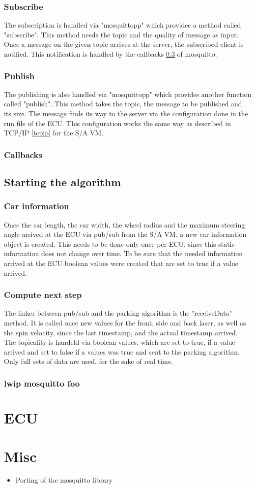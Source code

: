 \documentclass[paper=a4, fontsize=11pt]{scrreprt}
\begin{document}
  \subsection{Subscribe}
The subscription is handled via "mosquittopp" which provides a method called "subscribe". This method needs the topic and the quality of message as input. Once a message on the given topic arrives at the server, the subscribed client is notified. This notification is handled by the callbacks \ref{callbacks} of mosquitto.
  \subsection{Publish}
The publishing is also handled via "mosquittopp" which provides another function called "publish". This method takes the topic, the message to be published and its size. The message finds its way to the server via the configuration done in the run file of the ECU. This configuration works the same way as described in TCP/IP \ref{tcpip} for the S/A VM.
  \subsection{Callbacks} \label{callbacks}
  \section{Starting the algorithm}
  \subsection{Car information}
Once the car length, the car width, the wheel radius and the maximum steering angle arrived at the ECU via pub/sub from the S/A VM, a new car information object is created. This needs to be done only once per ECU, since this static information does not change over time.
To be sure that the needed information arrived at the ECU boolean values were created that are set to true if a value arrived.
  \subsection{Compute next step}
The linker between pub/sub and the parking algorithm is the "receiveData" method. It is called once new values for the front, side and back laser, as well as the spin velocity, since the last timestamp, and the actual timestamp arrived. The topicality is handeld via boolean values, which are set to true, if a value arrived and set to false if a values was true and sent to the parking algorithm. Only full sets of data are used, for the sake of real time.
  \subsection{lwip mosquitto foo}
\chapter{ECU}
\chapter{Misc}
\begin{itemize}
  \item Porting of the mosquitto library %
\end{itemize}


\end{document}

